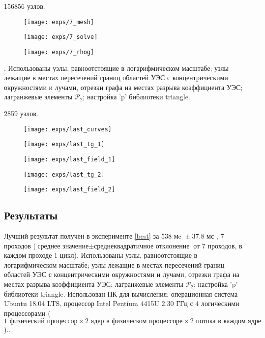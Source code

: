 156856 узлов.

\begin{figure}[H]
  \texttt{[image: exps/7\_mesh]}
\end{figure}
\begin{figure}[H]
  \texttt{[image: exps/7\_solve]}
\end{figure}
\begin{figure}[H]
  \texttt{[image: exps/7\_rhog]}
\end{figure}


 \theexp \label{best}.
Использованы узлы, равноотстоящие в логарифмическом масштабе;
узлы лежащие в местах пересечений границ областей УЭС с концентрическими окружностями и лучами,
отрезки графа на местах разрыва коэффициента УЭС; лагранжевые элементы ${\mathcal{P}_2}$; настройка 'p' библиотеки triangle.

2859 узлов.

\begin{figure}[H]
\texttt{[image: exps/last\_curves]}
\caption{}
\end{figure}

\begin{figure}[H]
\texttt{[image: exps/last\_tg\_1]}
\caption{}
\end{figure}

\begin{figure}[H]
\texttt{[image: exps/last\_field\_1]}
\caption{}
\end{figure}

\begin{figure}[H]
\texttt{[image: exps/last\_tg\_2]}
\caption{}
\end{figure}

\begin{figure}[H]
\texttt{[image: exps/last\_field\_2]}
\caption{}
\end{figure}


\subsection{Результаты}

Лучший результат получен в эксперименте \ref{best} за ${538 \text{ мc } \pm 37.8 \text{ мс }}$, 7 проходов
(${\text{среднее значение} \pm \text{среднеквадратичное отклонение}}$ от 7 проходов, в каждом проходе 1 цикл). Использованы узлы, равноотстоящие в логарифмическом масштабе; узлы лежащие в местах пересечений границ областей УЭС с концентрическими окружностями и лучами, отрезки графа на местах разрыва коэффициента УЭС; лагранжевые элементы ${\mathcal{P}_2}$; настройка 'p' библиотеки triangle. Использован ПК для вычисления: операционная система Ubuntu 18.04 LTS, процессор Intel Pentium 4415U 2.30 ГГц с 4 логическими процессорами ($1 \text{ физический процессор} \times 2 \text{ ядер в физическом процессоре} \times 2 \text{ потока в каждом ядре}$)..

